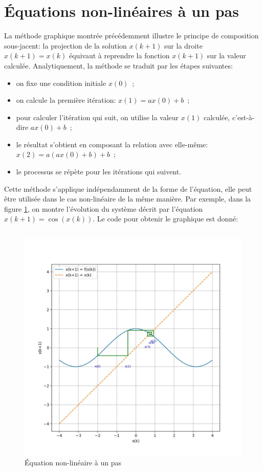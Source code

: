     \section{Équations non-linéaires à un pas}
        La méthode graphique montrée précédemment illustre le principe de composition sous-jacent: la projection de la solution $x(k+1)$ sur la droite $x(k+1)=x(k)$ équivaut à reprendre la fonction $x(k+1)$ sur la valeur calculée. Analytiquement, la méthode se traduit par les étapes suivantes:
        \begin{itemize}
            \item on fixe une condition initiale $x(0)$~;
            \item on calcule la première itération: $x(1) = ax(0)+b$~;
            \item pour calculer l'itération qui suit, on utilise la valeur $x(1)$ calculée, c'est-à-dire $ax(0)+b$~;
            \item le résultat s'obtient en composant la relation avec elle-même: $x(2) = a(ax(0)+b)+b$~;
            \item le processus se répète pour les itérations qui suivent.
        \end{itemize}
        Cette méthode s'applique indépendamment de la forme de l'équation, elle peut être utilisée dans le cas non-linéaire de la même manière. Par exemple, dans la figure \ref{fig:un_pas_2}, on montre l'évolution du système décrit par l'équation $x(k+1) = \cos(x(k))$. Le code pour obtenir le graphique est donné:
        \inputminted{python}{codes/un_pas.py}
        \begin{figure}[ht!]
            \centering
            \includegraphics[width=\textwidth]{images/un_pas_2.jpg}
            \caption{Équation non-linéaire à un pas}
            \label{fig:un_pas_2}
        \end{figure}
